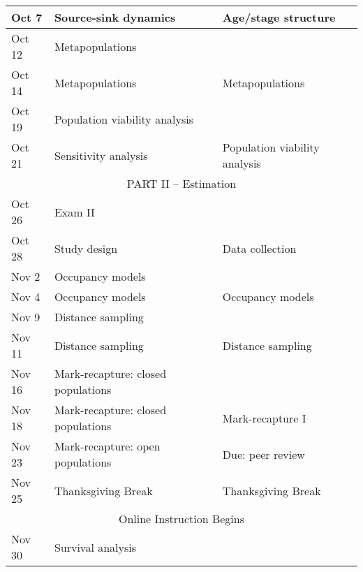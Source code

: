 \documentclass[12pt]{article}
\begin{document}
\begin{center}
\begin{tabular}[c]{lll}
Oct 7      & Source-sink dynamics               & Age/stage structure                  \\
\hline
Oct 12     & Metapopulations                    &                                      \\
Oct 14     & Metapopulations                    & Metapopulations                      \\
\hline
Oct 19     & Population viability analysis      &                                      \\
Oct 21     & Sensitivity analysis               & Population viability analysis        \\
\hline
           \multicolumn{3}{c}{PART II -- Estimation}                                   \\
\hline
Oct 26     & Exam II                            &                                      \\
Oct 28     & Study design                       & Data collection                      \\
\hline
Nov 2      & Occupancy models                   &                                      \\
Nov 4      & Occupancy models                   & Occupancy models                     \\
\hline
Nov 9      & Distance sampling                  &                                      \\
Nov 11     & Distance sampling                  & Distance sampling                    \\
\hline
Nov 16     & Mark-recapture: closed populations   &                                      \\
Nov 18     & Mark-recapture: closed populations   & Mark-recapture I                    \\
\hline
Nov 23     & Mark-recapture: open populations   & Due: peer review                     \\
Nov 25     & Thanksgiving Break                 & Thanksgiving Break                   \\
\hline
           \multicolumn{3}{c}{Online Instruction Begins}                               \\
\hline
Nov 30     & Survival analysis                       &                                      \\

\end{tabular}
\end{center}
\end{document}
